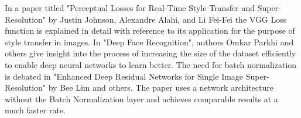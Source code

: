 In a paper titled "Perceptual Losses for Real-Time Style Transfer and Super-Resolution"  
by Justin Johnson, Alexandre Alahi, and Li Fei-Fei the VGG Loss function is explained in detail with reference to its application for the purpose of style transfer in images. 
In "Deep Face Recognition", authors Omkar Parkhi and others give insight into the process of increasing the size of the dataset efficiently to enable deep neural networks to learn better. The need for batch normalization is debated in "Enhanced Deep Residual Networks for Single Image Super-Resolution" by Bee Lim and others. The paper uses a network architecture without the Batch Normalization layer and achieves comparable results at a much faster rate. 